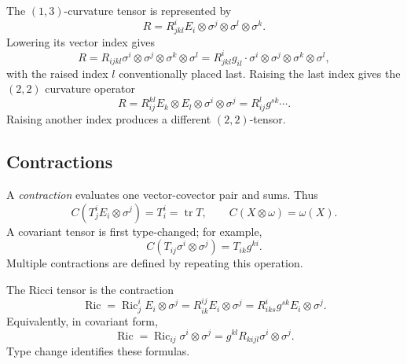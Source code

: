 \begin{notation}
  \label{def:pet-ch1-curvature-types}
  \leanok
  The $(1,3)$-curvature tensor is represented by
  \[
    R=R^i_{jkl}E_i\otimes\sigma^j\otimes\sigma^l\otimes\sigma^k.
  \]
  Lowering its vector index gives
  \[
    R=R_{ijkl}\sigma^i\otimes\sigma^j\otimes\sigma^k\otimes\sigma^l
      =R^i_{jkl}g_{il}\cdot
        \sigma^i\otimes\sigma^j\otimes\sigma^k\otimes\sigma^l,
  \]
  with the raised index $l$ conventionally placed last. Raising the last index
  gives the $(2,2)$ curvature operator
  \[
    R=R^{kl}_{ij}E_k\otimes E_l\otimes\sigma^i\otimes\sigma^j
      =R^l_{ij}g^{sk}\cdots.
  \]
  Raising another index produces a different $(2,2)$-tensor.
\end{notation}

\subsection{Contractions}

\begin{definition}[Contraction]
  \label{def:pet-ch1-contraction}
  \leanok
  A \emph{contraction} evaluates one vector-covector pair and sums. Thus
  \[
    C(T^i_jE_i\otimes\sigma^j)=T^i_i=\operatorname{tr}T,
    \qquad C(X\otimes\omega)=\omega(X).
  \]
  A covariant tensor is first type-changed; for example,
  \[
    C(T_{ij}\sigma^i\otimes\sigma^j)=T_{ik}g^{ki}.
  \]
  Multiple contractions are defined by repeating this operation.
\end{definition}

\begin{remark}
  \label{rem:pet-ch1-ricci-contraction}
  \leanok
  The Ricci tensor is the contraction
  \[
    \operatorname{Ric}
      =\operatorname{Ric}^i_jE_i\otimes\sigma^j
      =R^{ij}_{ik}E_i\otimes\sigma^j
      =R^i_{iks}g^{sk}E_i\otimes\sigma^j.
  \]
  Equivalently, in covariant form,
  \[
    \operatorname{Ric}
      =\operatorname{Ric}_{ij}\sigma^i\otimes\sigma^j
      =g^{kl}R_{kijl}\sigma^i\otimes\sigma^j.
  \]
  Type change identifies these formulas.
\end{remark}

